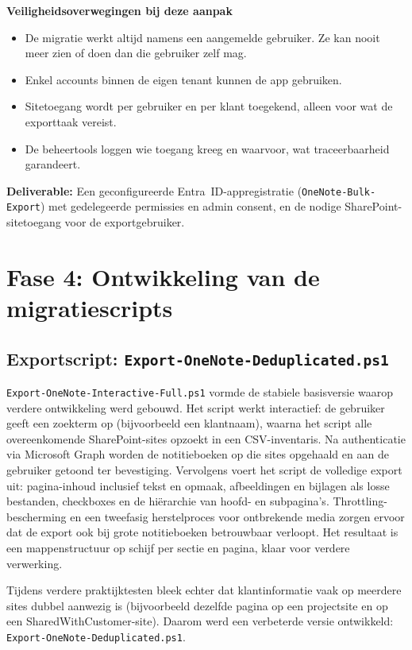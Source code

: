 \textbf{Veiligheidsoverwegingen bij deze aanpak}
\begin{itemize}
    \item De migratie werkt altijd namens een aangemelde gebruiker. Ze kan nooit meer zien of doen dan die gebruiker zelf mag.
    \item Enkel accounts binnen de eigen tenant kunnen de app gebruiken.
    \item Sitetoegang wordt per gebruiker en per klant toegekend, alleen voor wat de exporttaak vereist.
    \item De beheertools loggen wie toegang kreeg en waarvoor, wat traceerbaarheid garandeert.
\end{itemize}

\textbf{Deliverable:} Een geconfigureerde Entra~ID-appregistratie (\texttt{OneNote-Bulk-Export}) met gedelegeerde permissies en admin consent, en de nodige SharePoint-sitetoegang voor de exportgebruiker.

\section{Fase 4: Ontwikkeling van de migratiescripts}
\label{sec:fase4-scripts}

\subsection{Exportscript: \texttt{Export-OneNote-Deduplicated.ps1}}
\label{subsec:exportscript}

\texttt{Export-OneNote-Interactive-Full.ps1} vormde de stabiele basisversie waarop verdere ontwikkeling werd gebouwd. Het script werkt interactief: de gebruiker geeft een zoekterm op (bijvoorbeeld een klantnaam), waarna het script alle overeenkomende SharePoint-sites opzoekt in een CSV-inventaris. Na authenticatie via Microsoft Graph worden de notitieboeken op die sites opgehaald en aan de gebruiker getoond ter bevestiging. Vervolgens voert het script de volledige export uit: pagina-inhoud inclusief tekst en opmaak, afbeeldingen en bijlagen als losse bestanden, checkboxes en de hiërarchie van hoofd- en subpagina's. Throttling-bescherming en een tweefasig herstelproces voor ontbrekende media zorgen ervoor dat de export ook bij grote notitieboeken betrouwbaar verloopt. Het resultaat is een mappenstructuur op schijf per sectie en pagina, klaar voor verdere verwerking.

Tijdens verdere praktijktesten bleek echter dat klantinformatie vaak op meerdere sites dubbel aanwezig is (bijvoorbeeld dezelfde pagina op een projectsite en op een SharedWithCustomer-site). Daarom werd een verbeterde versie ontwikkeld: \texttt{Export-OneNote-Deduplicated.ps1}.

